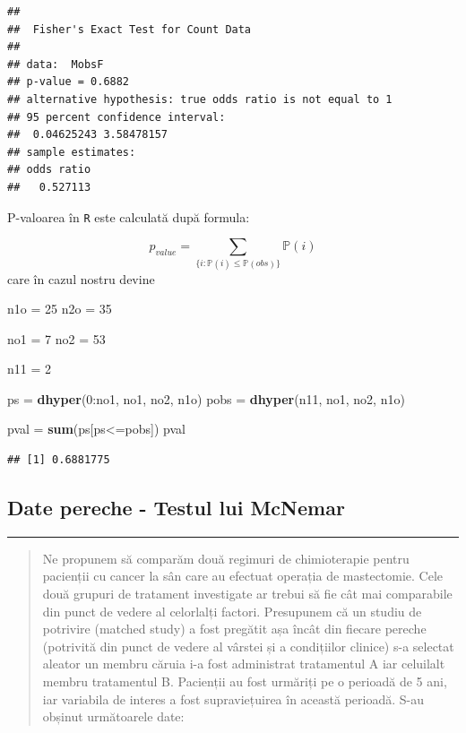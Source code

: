 \documentclass[]{article}
\newenvironment{Shaded}{\begin{snugshade}}{\end{snugshade}}
\newcommand{\KeywordTok}[1]{\textcolor[rgb]{0.13,0.29,0.53}{\textbf{{#1}}}}
\newcommand{\DecValTok}[1]{\textcolor[rgb]{0.00,0.00,0.81}{{#1}}}
\newcommand{\StringTok}[1]{\textcolor[rgb]{0.31,0.60,0.02}{{#1}}}
\newcommand{\NormalTok}[1]{{#1}}
\begin{document}
\begin{verbatim}
## 
##  Fisher's Exact Test for Count Data
## 
## data:  MobsF
## p-value = 0.6882
## alternative hypothesis: true odds ratio is not equal to 1
## 95 percent confidence interval:
##  0.04625243 3.58478157
## sample estimates:
## odds ratio 
##   0.527113
\end{verbatim}

P-valoarea în \texttt{R} este calculată după formula:

\[
  p_{value} = \sum_{\{i:\mathbb{P}(i)\leq \mathbb{P}(obs)\}}\mathbb{P}(i)
\] care în cazul nostru devine

\begin{Shaded}
\begin{Highlighting}[]
\NormalTok{n1o =}\StringTok{ }\DecValTok{25}
\NormalTok{n2o =}\StringTok{ }\DecValTok{35}
  
\NormalTok{no1 =}\StringTok{ }\DecValTok{7}
\NormalTok{no2 =}\StringTok{ }\DecValTok{53}

\NormalTok{n11 =}\StringTok{ }\DecValTok{2}
  
\NormalTok{ps =}\StringTok{ }\KeywordTok{dhyper}\NormalTok{(}\DecValTok{0}\NormalTok{:no1, no1, no2, n1o)}
\NormalTok{pobs =}\StringTok{ }\KeywordTok{dhyper}\NormalTok{(n11, no1, no2, n1o)}

\NormalTok{pval =}\StringTok{ }\KeywordTok{sum}\NormalTok{(ps[ps<=pobs])}
\NormalTok{pval}
\end{Highlighting}
\end{Shaded}

\begin{verbatim}
## [1] 0.6881775
\end{verbatim}

\subsection{Date pereche - Testul lui
McNemar}\label{date-pereche---testul-lui-mcnemar}

\begin{center}\rule{0.5\linewidth}{\linethickness}\end{center}

\begin{quote}
Ne propunem să comparăm două regimuri de chimioterapie pentru pacienții
cu cancer la sân care au efectuat operația de mastectomie. Cele două
grupuri de tratament investigate ar trebui să fie cât mai comparabile
din punct de vedere al celorlalți factori. Presupunem că un studiu de
potrivire (matched study) a fost pregătit așa încât din fiecare pereche
(potrivită din punct de vedere al vârstei și a condițiilor clinice) s-a
selectat aleator un membru căruia i-a fost administrat tratamentul A iar
celuilalt membru tratamentul B. Pacienții au fost urmăriți pe o perioadă
de 5 ani, iar variabila de interes a fost supraviețuirea în această
perioadă. S-au obșinut următoarele date:
\end{quote}
\end{document}

